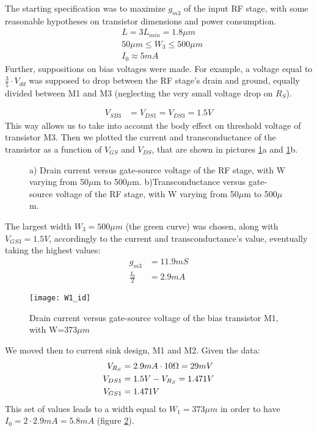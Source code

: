 The starting specification was to maximize \(g_{m3}\) of the input RF stage, with some reasonable hypotheses on transistor dimensions and power consumption. 
\begin{align}
	&L=3 L_{min} = 1.8\mu m \nonumber\\
	&50 \mu m \le W_3 \le 500 \mu m \nonumber \\
	&I_0 \approx 5mA \nonumber 
\end{align}
Further, suppositions on bias voltages were made. For example, a voltage equal to \(\frac{3}{5}\cdot V_{dd}\) was supposed to drop between the RF stage's drain and ground, equally divided between M1 and M3 (neglecting the very small voltage drop on \(R_S\)). 

\begin{align}
	V_{SB3} &= V_{DS1} = V_{DS3} = 1.5 V \nonumber 
\end{align}
This way allows us to take into account the body effect on threshold voltage of transistor M3.
Then we plotted the current and transconductance of the transistor as a function of \(V_{GS}\) and \(V_{DS}\), that are shown in pictures \ref{fig:W_2_id_gm}a and \ref{fig:W_2_id_gm}b.
\begin{figure}[H] 
	\centering
	\subfloat[][\emph{}]{\texttt{[image: W2\_id]}} \quad
	\subfloat[][\emph{}]{\texttt{[image: W2\_gm]}}
	\caption{ a) Drain current versus gate-source voltage of the RF stage, with W varying from 50\(\mu\)m to 500\(\mu\)m. b)Transconductance versus gate-source voltage of the RF stage, with W varying from 50\(\mu\)m to 500\(\mu\)m.}
	\label{fig:W_2_id_gm}
\end{figure}
The largest width  \(W_3=500\mu m\) (the green curve) was chosen, along with \(V_{GS3}=1.5V\), accordingly to the current and transconductance's value, eventually taking the highest values:
\begin{align}
	g_{m3}&=11.9mS \nonumber \\
	\frac{I_0}{2}&=2.9mA \nonumber
\end{align}
\begin{figure}[H]
	\centering
	\texttt{[image: W1\_id]}
	\caption{Drain current versus gate-source voltage of the bias transistor M1, with W=\(373\mu m\)}
	\label{W1_id}
\end{figure}
We moved then to current sink design, M1 and M2. Given the data:
\begin{align}
	V_{R_S} &= 2.9mA\cdot 10\ohm=29mV \notag \\
	V_{DS1}&=1.5V-V_{R_S}=1.471V \notag \\
	V_{GS1}&=1.471V \notag
\end{align}
This set of values leads to a width equal to \(W_1=373\mu m\) in order to have \(I_0=2\cdot2.9mA=5.8mA\) (figure \ref{W1_id}).

